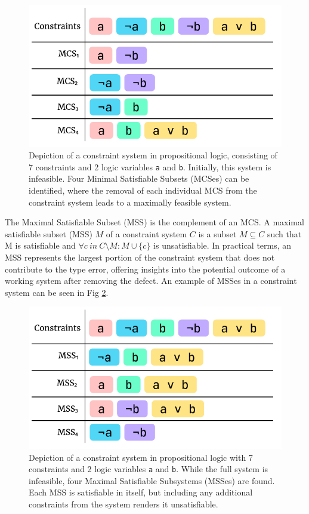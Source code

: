 \begin{figure}[hbt]
  \includegraphics[width=0.8\linewidth]{MCS}
  \caption{
    \label{fig:mcs-example}
    Depiction of a constraint system in propositional logic, consisting of 7 constraints and 2 logic variables \texttt{a} and \texttt{b}. Initially, this system is infeasible. Four Minimal Satisfiable Subsets (MCSes) can be identified, where the removal of each individual MCS from the constraint system leads to a maximally feasible system.}
\end{figure}

The Maximal Satisfiable Subset (MSS) is the complement of an MCS. A maximal satisfiable subset (MSS) $M$ of a constraint system $C$ is a subset $M \subseteq C$ such that M is satisfiable and $\forall{c}\ in\ C \setminus M:M\cup\{c\}$ is unsatisfiable. In practical terms, an MSS represents the largest portion of the constraint system that does not contribute to the type error, offering insights into the potential outcome of a working system after removing the defect. An example of MSSes in a constraint system can be seen in Fig \ref{fig:mss-example}.




\begin{figure}[hbt]
  \includegraphics[width=0.8\linewidth]{MSS}
  \caption{
    \label{fig:mss-example}
    Depiction of a constraint system in propositional logic with 7 constraints and 2 logic variables \texttt{a} and \texttt{b}. While the full system is infeasible, four Maximal Satisfiable Subsystems (MSSes) are found. Each MSS is satisfiable in itself, but including any additional constraints from the system renders it unsatisfiable. }
\end{figure}

